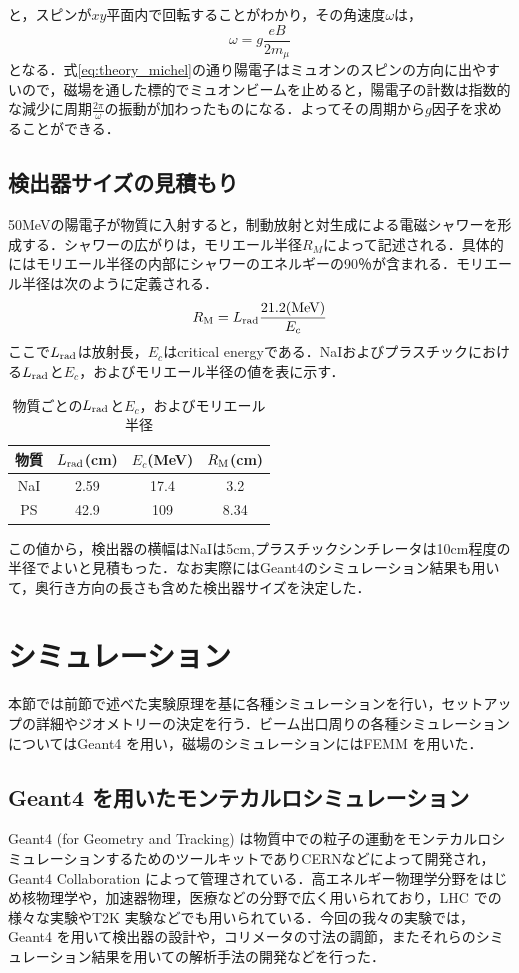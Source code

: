 と，スピンが$xy$平面内で回転することがわかり，その角速度$\omega$は，
\begin{equation}
\omega = g\frac{eB}{2m_\mu}
\end{equation}
となる．式\eqref{eq:theory_michel}の通り陽電子はミュオンのスピンの方向に出やすいので，磁場を通した標的でミュオンビームを止めると，陽電子の計数は指数的な減少に周期$\frac{2\pi}{\omega}$の振動が加わったものになる．よってその周期から$g$因子を求めることができる．
\subsection{検出器サイズの見積もり}
50MeVの陽電子が物質に入射すると，制動放射と対生成による電磁シャワーを形成する．シャワーの広がりは，モリエール半径$R_M$によって記述される．具体的にはモリエール半径の内部にシャワーのエネルギーの90％が含まれる．モリエール半径は次のように定義される．
\begin{equation}
R_{\rm M} = L_{\rm rad}\frac{21.2{\rm (MeV)}}{E_c}
\end{equation}
ここで$L_{\rm rad}$は放射長，$E_c$はcritical energyである．NaIおよびプラスチックにおける$L_{\rm rad}$と$E_c$，およびモリエール半径の値を表に示す．
\begin{table}[b]
\centering
  \begin{tabular}{cccc}
    物質 & $L_{\rm rad}$(cm) & $E_c$(MeV) & $R_{\rm M}$(cm) \\\hline \hline
    NaI & 2.59 & 17.4 & 3.2 \\
    PS & 42.9 & 109 & 8.34 \\
  \end{tabular}
  \caption{物質ごとの$L_{\rm rad}$と$E_c$，およびモリエール半径}
\end{table}
この値から，検出器の横幅はNaIは5cm,プラスチックシンチレータは10cm程度の半径でよいと見積もった．なお実際にはGeant4のシミュレーション結果も用いて，奥行き方向の長さも含めた検出器サイズを決定した．
\newpage

\section{シミュレーション}
	本節では前節で述べた実験原理を基に各種シミュレーションを行い，セットアップの詳細やジオメトリーの決定を行う．ビーム出口周りの各種シミュレーションについてはGeant4 を用い，磁場のシミュレーションにはFEMM を用いた．
	
	\subsection{Geant4 を用いたモンテカルロシミュレーション}
	Geant4 (for Geometry and Tracking) は物質中での粒子の運動をモンテカルロシミュレーションするためのツールキットでありCERNなどによって開発され，Geant4 Collaboration によって管理されている．高エネルギー物理学分野をはじめ核物理学や，加速器物理，医療などの分野で広く用いられており，LHC での様々な実験やT2K 実験などでも用いられている．今回の我々の実験では，Geant4 を用いて検出器の設計や，コリメータの寸法の調節，またそれらのシミュレーション結果を用いての解析手法の開発などを行った．%
